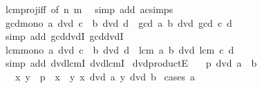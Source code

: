 \begin{isabellebody}
\isatagproof
{}\isamarkupfalse%
\ lcm{\isacharunderscore}{\kern0pt}proj{}{\isacharunderscore}{\kern0pt}iff\ {\isacharbrackleft}{\kern0pt}of\ n\ m{\isacharbrackright}{\kern0pt}\ \isamarkupfalse%
\ {\isacharparenleft}{\kern0pt}simp\ add{\isacharcolon}{\kern0pt}\ ac{\isacharunderscore}{\kern0pt}simps{\isacharparenright}{\kern0pt}%
\endisatagproof
{\isafoldproof}%
%
\isadelimproof
\isanewline
%
\endisadelimproof
\isanewline
{}\isamarkupfalse%
\ gcd{\isacharunderscore}{\kern0pt}mono{\isacharcolon}{\kern0pt}\ {\isachardoublequoteopen}a\ dvd\ c\ {\isasymLongrightarrow}\ b\ dvd\ d\ {\isasymLongrightarrow}\ gcd\ a\ b\ dvd\ gcd\ c\ d{\isachardoublequoteclose}\isanewline
%
\isadelimproof
\ \ %
\endisadelimproof
%
\isatagproof
{}\isamarkupfalse%
\ {\isacharparenleft}{\kern0pt}simp\ add{\isacharcolon}{\kern0pt}\ gcd{\isacharunderscore}{\kern0pt}dvdI{}\ gcd{\isacharunderscore}{\kern0pt}dvdI{}{\isacharparenright}{\kern0pt}%
\endisatagproof
{\isafoldproof}%
%
\isadelimproof
\isanewline
%
\endisadelimproof
\isanewline
{}\isamarkupfalse%
\ lcm{\isacharunderscore}{\kern0pt}mono{\isacharcolon}{\kern0pt}\ {\isachardoublequoteopen}a\ dvd\ c\ {\isasymLongrightarrow}\ b\ dvd\ d\ {\isasymLongrightarrow}\ lcm\ a\ b\ dvd\ lcm\ c\ d{\isachardoublequoteclose}\isanewline
%
\isadelimproof
\ \ %
\endisadelimproof
%
\isatagproof
{}\isamarkupfalse%
\ {\isacharparenleft}{\kern0pt}simp\ add{\isacharcolon}{\kern0pt}\ dvd{\isacharunderscore}{\kern0pt}lcmI{}\ dvd{\isacharunderscore}{\kern0pt}lcmI{}{\isacharparenright}{\kern0pt}%
\endisatagproof
{\isafoldproof}%
%
\isadelimproof
\isanewline
%
\endisadelimproof
\isanewline
{}\isamarkupfalse%
\ dvd{\isacharunderscore}{\kern0pt}productE{\isacharcolon}{\kern0pt}\isanewline
\ \ \ {\isachardoublequoteopen}p\ dvd\ a\ {\isacharasterisk}{\kern0pt}\ b{\isachardoublequoteclose}\isanewline
\ \ \ x\ y\ \ {\isachardoublequoteopen}p\ {\isacharequal}{\kern0pt}\ x\ {\isacharasterisk}{\kern0pt}\ y{\isachardoublequoteclose}\ {\isachardoublequoteopen}x\ dvd\ a{\isachardoublequoteclose}\ {\isachardoublequoteopen}y\ dvd\ b{\isachardoublequoteclose}\isanewline
%
\isadelimproof
%
\endisadelimproof
%
\isatagproof
{}\isamarkupfalse%
\ {\isacharparenleft}{\kern0pt}cases\ {\isachardoublequoteopen}a\ {\isacharequal}{\kern0pt}\ {}{\isachardoublequoteclose}{\isacharparenright}{\kern0pt}\isanewline
\ \ \isamarkupfalse%

\end{isabellebody}

